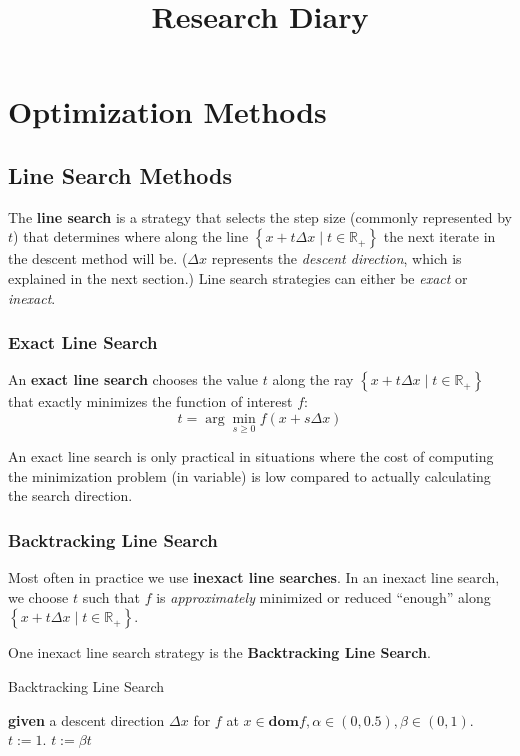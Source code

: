 \documentclass[11pt]{article}
\begin{document}
\univlogo

\title{Research Diary}


{\huge {}}

\section*{Optimization Methods}
\subsection*{Line Search Methods}

The {\color{tiananmen}\textbf{line search}} is a strategy that selects the step size (commonly represented by $t$) that determines where along the line $\left\lbrace x+t\Delta x\mid t\in\mathbb{R}_+\right\rbrace$ the next iterate in the descent method will be. ($\Delta x$ represents the \textit{descent direction}, which is explained in the next section.) Line search strategies can either be \textit{exact} or \textit{inexact}.

\subsubsection*{Exact Line Search}

An {\color{tiananmen}\textbf{exact line search}} chooses the value $t$ along the ray $\left\lbrace x+t\Delta x\mid t\in\mathbb{R}_+\right\rbrace$ that exactly minimizes the function of interest $f$:
{\color{baystate}$$t=\arg\min_{s\geq 0}f(x+s\Delta x)$$}

An exact line search is only practical in situations where the cost of computing the minimization problem (in variable) is low compared to actually calculating the search direction.
\subsubsection*{Backtracking Line Search}
Most often in practice we use {\color{tiananmen}\textbf{inexact line searches}}. In an inexact line search, we choose $t$ such that $f$ is \textit{approximately} minimized or reduced ``enough'' along $\left\lbrace x+t\Delta x\mid t\in\mathbb{R}_+\right\rbrace$.

One inexact line search strategy is the {\color{tiananmen}\textbf{Backtracking Line Search}}.
\begin{algorithm}[H]
	\caption{Backtracking Line Search \cite{Boyd2004}\label{BacktrackingLineSearchAlg}}
	\begin{algorithmic} 
		\State \textbf{given} a descent direction $\Delta x$ for $f$ at $x\in\textbf{dom}f,\alpha\in(0,0.5),\beta\in(0,1)$.
		\State $t:=1$.
			\State $t:=\beta t$
			\EndWhile
	\end{algorithmic}
\end{algorithm}
\end{document}
